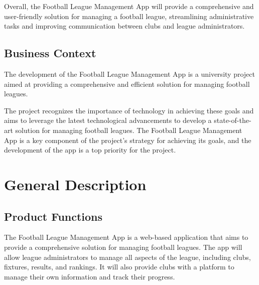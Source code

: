 \documentclass[12pt]{article}
\begin{document}
Overall, the Football League Management App will provide a comprehensive and user-friendly solution for managing a football league, streamlining administrative tasks and improving communication between clubs and league administrators.
\subsection{ Business Context}
The development of the Football League Management App is a university project aimed at providing a comprehensive and efficient solution for managing football leagues.

The project recognizes the importance of technology in achieving these goals and aims to leverage the latest technological advancements to develop a state-of-the-art solution for managing football leagues. The Football League Management App is a key component of the project's strategy for achieving its goals, and the development of the app is a top priority for the project.



\section{General Description}
\subsection{Product Functions}

The Football League Management App is a web-based application that aims to provide a comprehensive solution for managing football leagues. The app will allow league administrators to manage all aspects of the league, including clubs, fixtures, results, and rankings. It will also provide clubs with a platform to manage their own information and track their progress.
\end{document}
